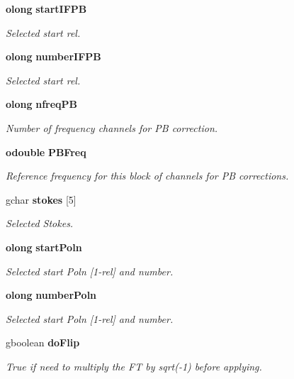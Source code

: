 \begin{CompactItemize}
{\bf olong} {\bf start\-IFPB}
\begin{CompactList}\small\item\em Selected start rel. \item\end{CompactList}\item 
{\bf olong} {\bf number\-IFPB}
\begin{CompactList}\small\item\em Selected start rel. \item\end{CompactList}\item 
{\bf olong} {\bf nfreq\-PB}
\begin{CompactList}\small\item\em Number of frequency channels for PB correction. \item\end{CompactList}\item 
{\bf odouble} {\bf PBFreq}
\begin{CompactList}\small\item\em Reference frequency for this block of channels for PB corrections. \item\end{CompactList}\item 
gchar {\bf stokes} [5]
\begin{CompactList}\small\item\em Selected Stokes. \item\end{CompactList}\item 
{\bf olong} {\bf start\-Poln}
\begin{CompactList}\small\item\em Selected start Poln [1-rel] and number. \item\end{CompactList}\item 
{\bf olong} {\bf number\-Poln}
\begin{CompactList}\small\item\em Selected start Poln [1-rel] and number. \item\end{CompactList}\item 
gboolean {\bf do\-Flip}
\begin{CompactList}\small\item\em True if need to multiply the FT by sqrt(-1) before applying. \item\end{CompactList}\item 

\end{CompactItemize}
